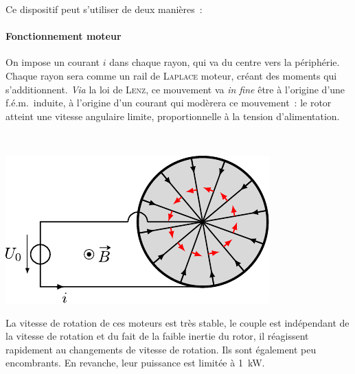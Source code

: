 \documentclass[../../main/main.tex]{subfiles}
\begin{document}
Ce dispositif peut s'utiliser de deux manières~:
\bigbreak
\noindent
\begin{minipage}[t]{.65\linewidth}
	\paragraph*{Fonctionnement moteur} On impose un courant $i$ dans chaque rayon,
	qui va du centre vers la périphérie. Chaque rayon sera comme un rail de
	\textsc{Laplace} moteur, créant des moments qui s'additionnent.
	\smallbreak
	\textit{Via} la loi de \textsc{Lenz}, ce mouvement va \textit{in fine} être à
	l'origine d'une f.é.m.\ induite, à l'origine d'un courant qui modèrera ce
	mouvement~: le rotor atteint une vitesse angulaire limite, proportionnelle à
	la tension d'alimentation.
\end{minipage}
\hfill
\begin{minipage}[t]{.30\linewidth}
	~
	\vspace{-40pt}
	\begin{center}
		\includegraphics[width=\linewidth]{mot_entrefer}
		\label{fig:motentre}
	\end{center}
\end{minipage}
\bigbreak
La vitesse de rotation de ces moteurs est très stable, le couple est indépendant
de la vitesse de rotation et du fait de la faible inertie du rotor, il
réagissent rapidement au changements de vitesse de rotation. Ils sont également
peu encombrants. En revanche, leur puissance est limitée à \SI{1}{kW}.
\end{document}
